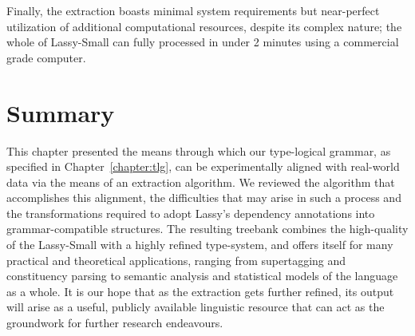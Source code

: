 Finally, the extraction boasts minimal system requirements but near-perfect utilization of additional computational resources, despite its complex nature; the whole of Lassy-Small can fully processed in under 2 minutes using a commercial grade computer.

\section{Summary}
This chapter presented the means through which our type-logical grammar, as specified in Chapter~\ref{chapter:tlg}, can be experimentally aligned with real-world data via the means of an extraction algorithm.
We reviewed the algorithm that accomplishes this alignment, the difficulties that may arise in such a process and the transformations required to adopt Lassy's dependency annotations into grammar-compatible structures.
The resulting treebank combines the high-quality of the Lassy-Small with a highly refined type-system, and offers itself for many practical and theoretical applications, ranging from supertagging and constituency parsing to semantic analysis and statistical models of the language as a whole.
It is our hope that as the extraction gets further refined, its output will arise as a useful, publicly available linguistic resource that can act as the groundwork for further research endeavours.